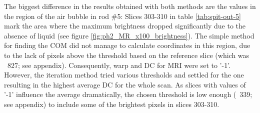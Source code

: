 The biggest difference in the results obtained with both methods are the values in the region of the air bubble in rod \#5:
Slices 303-310 in table \ref{tab:spit-out-5} mark the area where the maximum brightness dropped significantly due to the absence of liquid (see figure \ref{fig:ph2_MR_x100_brightness}).
The simple method for finding the COM did not manage to calculate coordinates in this region, due to the lack of pixels above the threshold based on the reference slice (which was ~827; see appendix).
Consequently, warp and DC for MRI were set to '-1'.
However, the iteration method tried various thresholds and settled for the one resulting in the highest average DC for the whole scan.
As slices with values of '-1' influence the average dramatically, the chosen threshold is low enough (~339; see appendix) to include some of the brightest pixels in slices 303-310.

